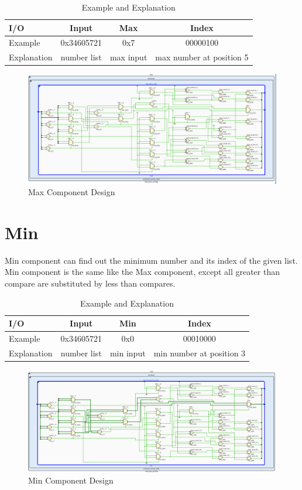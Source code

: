  \begin{table}[htb]
	\centering
	\caption{Example and Explanation }
	\begin{tabular}{l c c c}
		\toprule
		I/O  & Input  & Max  & Index \\ \midrule
		Example  &  0x34605721& 0x7& 00000100\\
		Explanation  & number list  & max input& max number at position 5  \\
		\bottomrule
	\end{tabular}
	\label{tab:max}
\end{table}
 
 \begin{figure}[htb]
	\centering
	\includegraphics[width=.8\linewidth]{figures/max8.png}
	\caption{Max Component Design}
	\label{fig:max}
\end{figure}
 
\section{Min}

Min component can find out the minimum number and its index of the given list. Min component is the same like the Max component, except all greater than compare are substituted by less than compares.

 \begin{table}[htb]
	\centering
	\caption{Example and Explanation }
	\begin{tabular}{l c c c}
		\toprule
		I/O  & Input  & Min  & Index \\ \midrule
		Example  &  0x34605721& 0x0& 00010000\\
		Explanation  & number list  & min input& min number at position 3  \\
		\bottomrule
	\end{tabular}
	\label{tab:tab-min}
\end{table}

 \begin{figure}[htb]
	\centering
	\includegraphics[width=.8\linewidth]{figures/min8.png}
	\caption{Min Component Design}
	\label{fig:min}
\end{figure}
 


